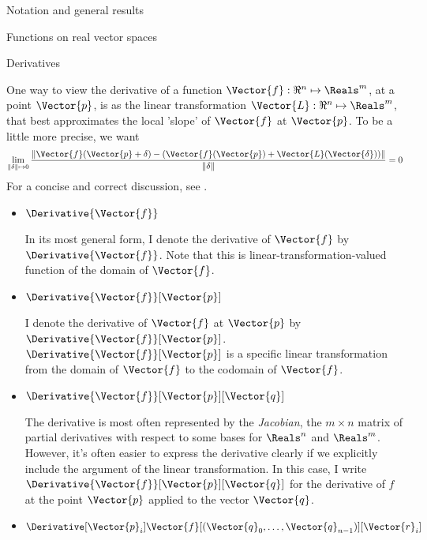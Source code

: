 \begin{plSection}{Notation and general results}
\begin{plSection}{Functions on real vector spaces}
\end{plSection}%
\begin{plSection}{Derivatives}
\label{sec:derivatives}

One way to view the derivative of a function
$\Vector{f}:{\Re}^{n} \mapsto \Reals^{m}$,
at a point $\Vector{p}$,
is as the linear transformation $\Vector{L}:{\Re}^{n} \mapsto \Reals^{m}$,
that best approximates the local 'slope' of $\Vector{f}$ at $\Vector{p}$.
To be a little more precise, we want
\begin{displaymath}
\lim_{ \|{\bf \delta}  \| \mapsto 0}
{ \|{\Vector{f}(\Vector{p} + {\bf \delta}) - (\Vector{f}(\Vector{p}) + \Vector{L}(\Vector{\delta})) \|}
  \over  \|{\bf \delta}  \|}
 = 0
\end{displaymath}
For a concise and correct discussion, see .

\begin{itemize}

\item $\Derivative{\Vector{f}}$

In its most general form,
I denote the derivative of $\Vector{f}$ by $\Derivative{\Vector{f}}$.
Note that this is
linear-transformation-valued function of the domain of $\Vector{f}$.

\item $\Derivative{\Vector{f}}[\Vector{p}]$

I denote the derivative of $\Vector{f}$ 
at $\Vector{p}$ by $\Derivative{\Vector{f}}[\Vector{p}]$.
$\Derivative{\Vector{f}}[\Vector{p}]$ 
is a specific linear transformation from
the domain of $\Vector{f}$ to the codomain of $\Vector{f}$.

\item $\Derivative{\Vector{f}}[\Vector{p}][\Vector{q}]$

The derivative is most often represented by the {\it Jacobian},
the $m \times n$ matrix of partial derivatives
with respect to some bases for $\Reals^n$ and $\Reals^m$.
However, it's often easier to express the derivative clearly if we
explicitly include the argument of the linear transformation.
In this case, I write $\Derivative{\Vector{f}}[\Vector{p}][\Vector{q}]$
for the derivative of $f$ at the point $\Vector{p}$
applied to the vector $\Vector{q}$.

\item $\Derivative[\Vector{p}_i]{\Vector{f}}
[(\Vector{q}_0,\ldots,\Vector{q}_{n-1})][\Vector{r}_i]$


\end{itemize}
\end{plSection}
\end{plSection}
